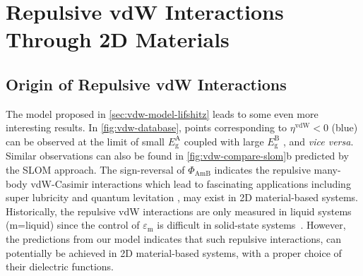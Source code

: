 \section{Repulsive vdW Interactions Through 2D Materials}
\label{sec:vdw-repuls-vdw-inter}

\subsection{Origin of Repulsive vdW Interactions}
\label{sec:vdw-origin-repulsive-vdw}

The model proposed in \autoref{sec:vdw-model-lifshitz} leads to some
even more interesting results.
%
In \autoref{fig:vdw-database}, points corresponding to
\(\eta^{\mathrm{vdW}} < 0\) (blue) can be observed at the limit of
small \(E_{\mathrm{g}}^{\mathrm{A}}\) coupled with large
\(E_{\mathrm{g}}^{\mathrm{B}}\) , and \emph{vice versa}.
%
Similar observations can also be found in
\autoref{fig:vdw-compare-slom}b predicted by the SLOM approach.
%
The sign-reversal of $\Phi_{\mathrm{AmB}}$ indicates the repulsive
many-body vdW-Casimir interactions
\cite{Munday_2009_repul,Zhao_2019_casimir_trap} which lead to
fascinating applications including super lubricity
\cite{Feiler_2008_superlubri} and quantum levitation
\cite{MUNDAY_2010_repul}, may exist in 2D material-based systems.
%
Historically, the repulsive vdW interactions are only measured in
liquid systems (m=liquid) since the control of
$\varepsilon_{\mathrm{m}}$ is difficult in solid-state
systems~\cite{Munday_2009_repul,MUNDAY_2010_repul}. However, the
predictions from our model indicates that such repulsive interactions,
can potentially be achieved in 2D material-based systems,
with a proper choice of their dielectric functions.

